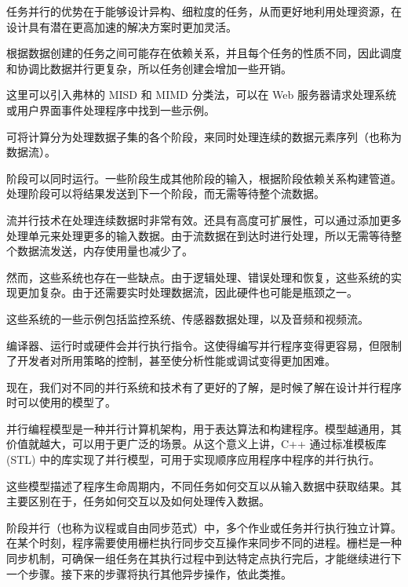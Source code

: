 任务并行的优势在于能够设计异构、细粒度的任务，从而更好地利用处理资源，在设计具有潜在更高加速的解决方案时更加灵活。

根据数据创建的任务之间可能存在依赖关系，并且每个任务的性质不同，因此调度和协调比数据并行更复杂，所以任务创建会增加一些开销。

这里可以引入弗林的 MISD 和 MIMD 分类法，可以在 Web 服务器请求处理系统或用户界面事件处理程序中找到一些示例。


可将计算分为处理数据子集的各个阶段，来同时处理连续的数据元素序列（也称为数据流）。

阶段可以同时运行。一些阶段生成其他阶段的输入，根据阶段依赖关系构建管道。处理阶段可以将结果发送到下一个阶段，而无需等待整个流数据。

流并行技术在处理连续数据时非常有效。还具有高度可扩展性，可以通过添加更多处理单元来处理更多的输入数据。由于流数据在到达时进行处理，所以无需等待整个数据流发送，内存使用量也减少了。

然而，这些系统也存在一些缺点。由于逻辑处理、错误处理和恢复，这些系统的实现更加复杂。由于还需要实时处理数据流，因此硬件也可能是瓶颈之一。

这些系统的一些示例包括监控系统、传感器数据处理，以及音频和视频流。


编译器、运行时或硬件会并行执行指令。这使得编写并行程序变得更容易，但限制了开发者对所用策略的控制，甚至使分析性能或调试变得更加困难。

\hspace*{\fill}

现在，我们对不同的并行系统和技术有了更好的了解，是时候了解在设计并行程序时可以使用的模型了。


并行编程模型是一种并行计算机架构，用于表达算法和构建程序。模型越通用，其价值就越大，可以用于更广泛的场景。从这个意义上讲，C++ 通过标准模板库 (STL) 中的库实现了并行模型，可用于实现顺序应用程序中程序的并行执行。

这些模型描述了程序生命周期内，不同任务如何交互以从输入数据中获取结果。其主要区别在于，任务如何交互以及如何处理传入数据。


阶段并行（也称为议程或自由同步范式）中，多个作业或任务并行执行独立计算。在某个时刻，程序需要使用栅栏执行同步交互操作来同步不同的进程。栅栏是一种同步机制，可确保一组任务在其执行过程中到达特定点执行完后，才能继续进行下一个步骤。接下来的步骤将执行其他异步操作，依此类推。

